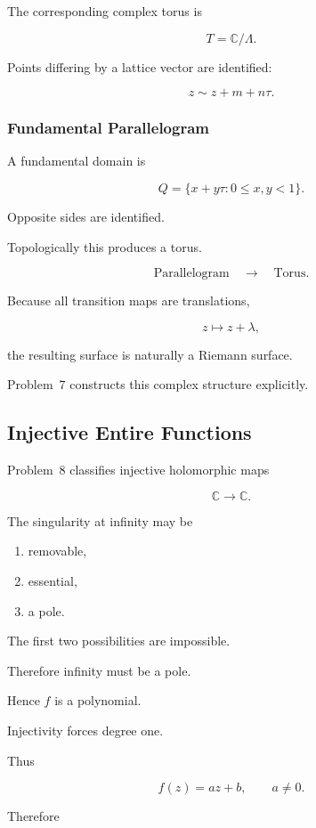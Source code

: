 \documentclass[12pt,a4paper]{article}
\theoremstyle{notespace}
\begin{document}
The corresponding complex torus is

\[
T=\mathbb C/\Lambda.
\]

Points differing by a lattice vector are identified:

\[
z
\sim
z+m+n\tau.
\]

\subsubsection*{Fundamental Parallelogram}

A fundamental domain is

\[
Q
=
\{x+y\tau:0\le x,y<1\}.
\]

Opposite sides are identified.

Topologically this produces a torus.

\[
\text{Parallelogram}
\quad\longrightarrow\quad
\text{Torus}.
\]

Because all transition maps are translations,

\[
z\mapsto z+\lambda,
\]

the resulting surface is naturally a Riemann surface.

Problem~7 constructs this complex structure explicitly.

\bigskip

\subsection{ Injective Entire Functions}

Problem~8 classifies injective holomorphic maps

\[
\mathbb C\to\mathbb C.
\]

The singularity at infinity may be

\begin{enumerate}
	\item removable,
	\item essential,
	\item a pole.
\end{enumerate}

The first two possibilities are impossible.

Therefore infinity must be a pole.

Hence \(f\) is a polynomial.

Injectivity forces degree one.

Thus

\[
\boxed{
	f(z)=az+b,
	\qquad
	a\neq0.
}
\]

Therefore
\end{document}
